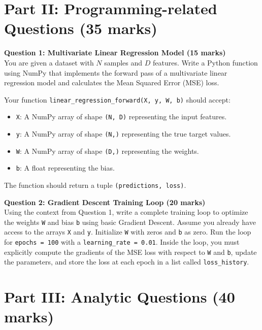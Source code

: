 \documentclass[11pt]{article}
\begin{document}
\vspace{1cm}

\section*{Part II: Programming-related Questions (35 marks)}

\textbf{Question 1: Multivariate Linear Regression Model (15 marks)}\\
You are given a dataset with $N$ samples and $D$ features. Write a Python function using NumPy that implements the forward pass of a multivariate linear regression model and calculates the Mean Squared Error (MSE) loss. 

Your function \texttt{linear\_regression\_forward(X, y, W, b)} should accept:
\begin{itemize}
    \item \texttt{X}: A NumPy array of shape \texttt{(N, D)} representing the input features.
    \item \texttt{y}: A NumPy array of shape \texttt{(N,)} representing the true target values.
    \item \texttt{W}: A NumPy array of shape \texttt{(D,)} representing the weights.
    \item \texttt{b}: A float representing the bias.
\end{itemize}
The function should return a tuple \texttt{(predictions, loss)}.

\vspace{0.5cm}

\textbf{Question 2: Gradient Descent Training Loop (20 marks)}\\
Using the context from Question 1, write a complete training loop to optimize the weights \texttt{W} and bias \texttt{b} using basic Gradient Descent. Assume you already have access to the arrays \texttt{X} and \texttt{y}. Initialize \texttt{W} with zeros and \texttt{b} as zero. Run the loop for \texttt{epochs = 100} with a \texttt{learning\_rate = 0.01}. Inside the loop, you must explicitly compute the gradients of the MSE loss with respect to \texttt{W} and \texttt{b}, update the parameters, and store the loss at each epoch in a list called \texttt{loss\_history}.

\vspace{1cm}

\section*{Part III: Analytic Questions (40 marks)}
\end{document}
